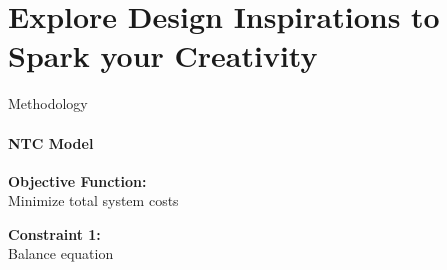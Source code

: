 \documentclass[aspectratio=169]{beamer}
\begin{document}
\section{Explore \textbf{Design Inspirations} to Spark  your Creativity}



\begin{frame}{Methodology}
    \framesubtitle{NTC Model}

    \vspace{-1cm}
    \begin{minipage}[t]{0.2\textwidth}
        \begin{coloredblockdark}[blue][][][][2.35cm][][0ex][0ex]
                \begin{minipage}[c][2.35cm][c]{0.4\textwidth}
                    \centering
                    \Large{}
                \end{minipage}%
                \hfill
                \begin{minipage}[c][2.35cm][c]{0.55\textwidth}
                    \centering
                    \tiny\textbf{Objective Function:}\\
                    Minimize total system costs
                \end{minipage}%
                \hspace{0.05\textwidth}
        \end{coloredblockdark}
        \vspace{-0.55cm}
        \begin{coloredblockdark}[blue][][][][2.35cm][][0ex][0ex]
                \begin{minipage}[c][2.35cm][c]{0.4\textwidth}
                    \centering
                    \Large{}
                \end{minipage}%
                \hfill
                \begin{minipage}[c][2.35cm][c]{0.55\textwidth}
                    \centering
                    \tiny\textbf{Constraint 1:}\\ 
                    Balance equation
                \end{minipage}%
                \hspace{0.05\textwidth}
        \end{coloredblockdark}
        \vspace{-0.55cm}
        \begin{coloredblockdark}[blue][][][][2.35cm][][0ex][0ex]

\end{coloredblockdark}
\end{minipage}
\end{frame}
\end{document}
